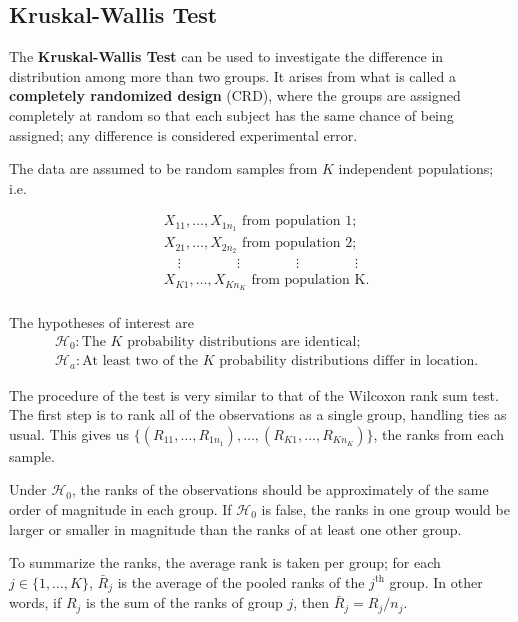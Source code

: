 \documentclass[12pt]{article}
\begin{document}
\subsection{Kruskal-Wallis Test}

The \textbf{Kruskal-Wallis Test} can be used to investigate the difference in distribution among more than two groups. It arises from what is called a \textbf{completely randomized design} (CRD), where the groups are assigned completely at random so that each subject has the same chance of being assigned; any difference is considered experimental error.

The data are assumed to be random samples from $K$ independent populations; i.e.

\begin{align*}
    &X_{11}, \dots, X_{1n_1} \text{ from population 1};\\
    &X_{21}, \dots, X_{2n_2} \text{ from population 2};\\
    &\quad \vdots \qquad \qquad \vdots \qquad \qquad \vdots \qquad \qquad \vdots \\
    &X_{K1}, \dots, X_{Kn_K} \text{ from population K}.\\
\end{align*}

The hypotheses of interest are 
\begin{align*}
    &\mathcal{H}_0: \text{The } K \text{ probability distributions are identical};\\
    &\mathcal{H}_a: \text{At least two of the } K \text{ probability distributions differ in location}.
\end{align*}

The procedure of the test is very similar to that of the Wilcoxon rank sum test. The first step is to rank all of the observations as a single group, handling ties as usual. This gives us $\{(R_{11}, \dots, R_{1n_1}), \dots, (R_{K1}, \dots, R_{Kn_K})\}$, the ranks from each sample.

Under $\mathcal{H}_0$, the ranks of the observations should be approximately of the same order of magnitude in each group. If $\mathcal{H}_0$ is false, the ranks in one group would be larger or smaller in magnitude than the ranks of at least one other group.

To summarize the ranks, the average rank is taken per group; for each $j \in \{1, \dots, K\}$, $\bar{R}_j$ is the average of the pooled ranks of the $j^{\text{th}}$ group. In other words, if $R_j$ is the sum of the ranks of group $j$, then $\bar{R}_j = R_j / n_j$.
\end{document}
